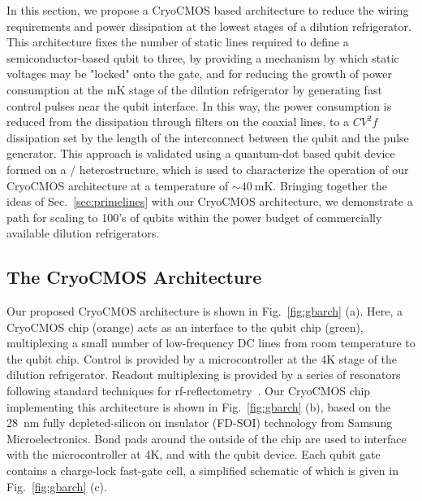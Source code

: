 In this section, we propose a CryoCMOS based architecture to reduce the wiring requirements and power dissipation at the lowest stages of a dilution refrigerator. This architecture
fixes the number of static lines required to define a semiconductor-based qubit to three, by providing a mechanism by which static voltages may be "locked" onto the gate, and for
reducing the growth of power consumption at the mK stage of the dilution refrigerator by generating fast control pulses near the qubit interface. In this way, the power
consumption is reduced from the dissipation through filters on the coaxial lines, to a $CV^2f$ dissipation set by the length of the interconnect between the qubit and the pulse
generator. This approach is validated using a quantum-dot based qubit device formed on a / heterostructure, which is used to characterize the operation of
our CryoCMOS architecture at a temperature of $\sim \SI{40}{\milli\kelvin}$. Bringing together the ideas of Sec.~\ref{sec:primelines} with our CryoCMOS architecture, we demonstrate
a path for scaling to 100's of qubits within the power budget of commercially available dilution refrigerators.

\subsection{The CryoCMOS Architecture}
\label{sec:gbarch}

Our proposed CryoCMOS architecture is shown in Fig.~\ref{fig:gbarch} (a). Here, a CryoCMOS chip (orange) acts as an interface to the qubit chip (green), multiplexing a small number
of low-frequency DC lines from room temperature to the qubit chip. Control is provided by a microcontroller at the 4K stage of the dilution refrigerator. Readout multiplexing is provided by a series of resonators~\cite{doi:10.1063/1.4868107} following standard techniques for rf-reflectometry~\cite{Reilly:2007ig,barthel2009rapid}. Our CryoCMOS chip implementing this architecture is shown in Fig.~\ref{fig:gbarch} (b), based on the \SI{28}{\nano\meter} fully depleted-silicon on insulator (FD-SOI) technology from Samsung Microelectronics. Bond pads around the outside of the chip are used to interface with the microcontroller at 4K, and with the qubit device. Each qubit gate contains a charge-lock fast-gate cell, a simplified schematic of which is given in Fig.~\ref{fig:gbarch} (c).

